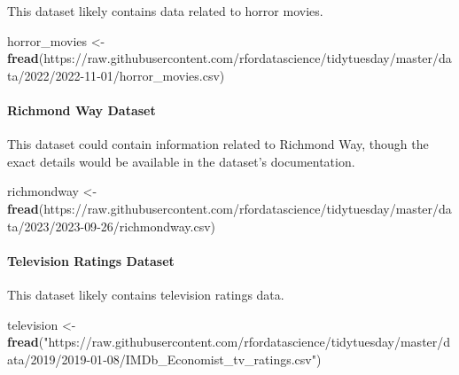 \documentclass[
]{book}
\newenvironment{Shaded}{\begin{snugshade}}{\end{snugshade}}
\newcommand{\FunctionTok}[1]{\textcolor[rgb]{0.13,0.29,0.53}{\textbf{#1}}}
\newcommand{\NormalTok}[1]{#1}
\newcommand{\OtherTok}[1]{\textcolor[rgb]{0.56,0.35,0.01}{#1}}
\newcommand{\StringTok}[1]{\textcolor[rgb]{0.31,0.60,0.02}{#1}}
\begin{document}
This dataset likely contains data related to horror movies.

\begin{Shaded}
\begin{Highlighting}[]
\NormalTok{horror\_movies }\OtherTok{\textless{}{-}} \FunctionTok{fread}\NormalTok{(}\StringTok{\textquotesingle{}https://raw.githubusercontent.com/rfordatascience/tidytuesday/master/data/2022/2022{-}11{-}01/horror\_movies.csv\textquotesingle{}}\NormalTok{)}
\end{Highlighting}
\end{Shaded}

\hypertarget{richmond-way-dataset}{%
\paragraph*{Richmond Way Dataset}\label{richmond-way-dataset}}

This dataset could contain information related to Richmond Way, though the exact details would be available in the dataset's documentation.

\begin{Shaded}
\begin{Highlighting}[]
\NormalTok{richmondway }\OtherTok{\textless{}{-}} \FunctionTok{fread}\NormalTok{(}\StringTok{\textquotesingle{}https://raw.githubusercontent.com/rfordatascience/tidytuesday/master/data/2023/2023{-}09{-}26/richmondway.csv\textquotesingle{}}\NormalTok{)}
\end{Highlighting}
\end{Shaded}

\hypertarget{television-ratings-dataset}{%
\paragraph*{Television Ratings Dataset}\label{television-ratings-dataset}}

This dataset likely contains television ratings data.

\begin{Shaded}
\begin{Highlighting}[]
\NormalTok{television }\OtherTok{\textless{}{-}} \FunctionTok{fread}\NormalTok{(}\StringTok{"https://raw.githubusercontent.com/rfordatascience/tidytuesday/master/data/2019/2019{-}01{-}08/IMDb\_Economist\_tv\_ratings.csv"}\NormalTok{)}
\end{Highlighting}
\end{Shaded}
\end{document}
